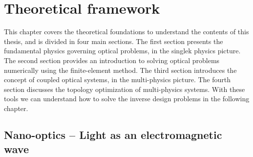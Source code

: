 \chapter{Theoretical framework}

This chapter covers the theoretical foundations to understand the contents of this thesis, 
and is divided in four main sections. The first section presents the fundamental physics
governing optical problems, in the singlek physics picture. The second section provides 
an introduction to solving optical problems numerically using the finite-element method.
The third section introduces the concept of coupled optical systems, in the multi-physics
picture. The fourth section discusses the topology optimization of multi-physics systems.
With these tools we can understand how to solve the inverse design problems in the following
chapter.






\section{Nano-optics -- Light as an electromagnetic wave}

